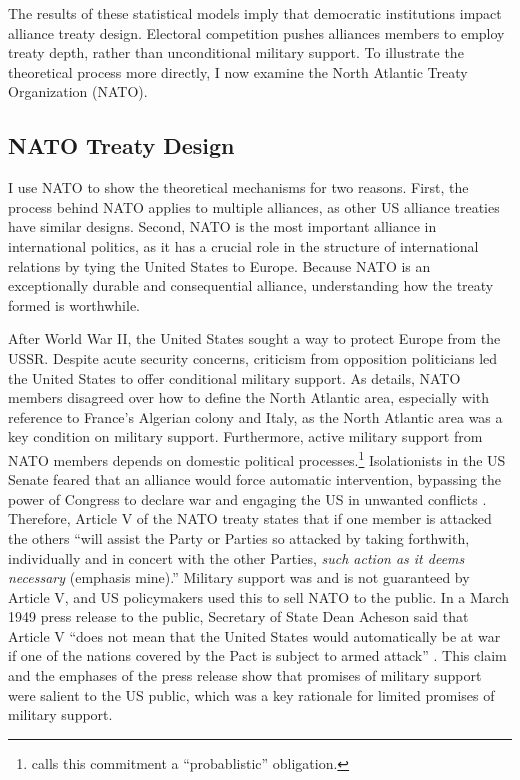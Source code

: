 \documentclass[12pt]{article}
\begin{document}
The results of these statistical models imply that democratic institutions impact alliance treaty design. 
Electoral competition pushes alliances members to employ treaty depth, rather than unconditional military support.  
To illustrate the theoretical process more directly, I now examine the North Atlantic Treaty Organization (NATO).


\subsection{NATO Treaty Design}


I use NATO to show the theoretical mechanisms for two reasons. 
First, the process behind NATO applies to multiple alliances, as other US alliance treaties have similar designs. 
Second, NATO is the most important alliance in international politics, as it has a crucial role in the structure of international relations by tying the United States to Europe. 
Because NATO is an exceptionally durable and consequential alliance, understanding how the treaty formed is worthwhile. 


After World War II, the United States sought a way to protect Europe from the USSR. 
Despite acute security concerns, criticism from opposition politicians led the United States to offer conditional military support. 
As \citet{Poast2019a} details, NATO members disagreed over how to define the North Atlantic area, especially with reference to France's Algerian colony and Italy, as the North Atlantic area was a key condition on military support. 
Furthermore, active military support from NATO members depends on domestic political processes.\footnote{\citet{Benson2012} calls this commitment a ``probablistic'' obligation.} 
Isolationists in the US Senate feared that an alliance would force automatic intervention, bypassing the power of Congress to declare war and engaging the US in unwanted conflicts \citep[pg. 280-1]{Acheson1969}.
Therefore, Article V of the NATO treaty states that if one member is attacked the others ``will assist the Party or Parties so attacked by taking forthwith, individually and in concert with the other Parties, \emph{such action as it deems necessary} (emphasis mine).'' 
Military support was and is not guaranteed by Article V, and US policymakers used this to sell NATO to the public. 
In a March 1949 press release to the public, Secretary of State Dean Acheson said that Article V ``does not mean that the United States would automatically be at war if one of the nations covered by the Pact is subject to armed attack'' \citep{Acheson1949}.
This claim and the emphases of the press release show that promises of military support were salient to the US public, which was a key rationale for limited promises of military support. 
\end{document}
